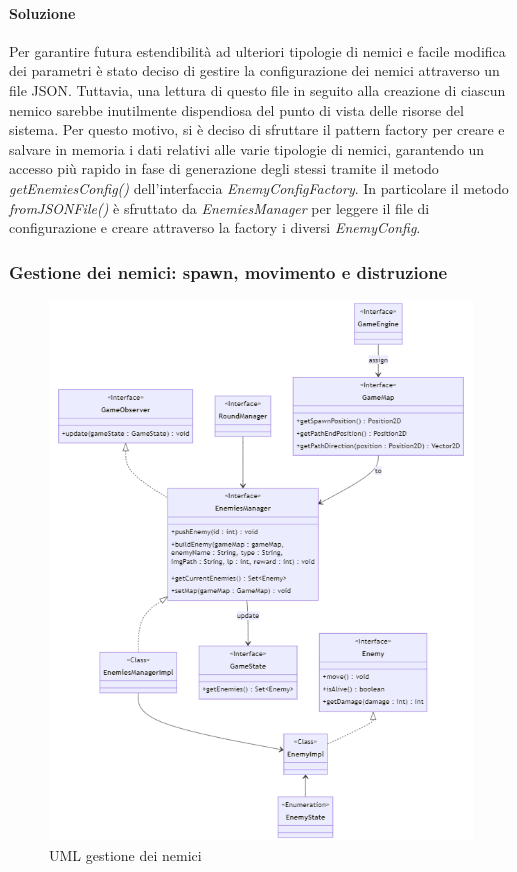 \documentclass[a4paper,12pt]{report}
\begin{document}
\paragraph{Soluzione} Per garantire futura estendibilità ad ulteriori tipologie di nemici e facile modifica dei parametri è stato deciso di gestire la configurazione dei nemici attraverso un file JSON. Tuttavia, una lettura di questo file in seguito alla creazione di ciascun nemico sarebbe inutilmente dispendiosa del punto di vista delle risorse del sistema. Per questo motivo, si è deciso di sfruttare il pattern factory per creare e salvare in memoria i dati relativi alle varie tipologie di nemici, garantendo un accesso più rapido in fase di generazione degli stessi tramite il metodo \textit{getEnemiesConfig()} dell'interfaccia \textit{EnemyConfigFactory}. In particolare il metodo \textit{fromJSONFile()} è sfruttato da \textit{EnemiesManager} per leggere il file di configurazione e creare attraverso la factory i diversi \textit{EnemyConfig}.

\subsubsection{Gestione dei nemici: spawn, movimento e distruzione}

\begin{figure}[H]
    \centering
    \includegraphics[scale=0.8]{RelazioneTD/images/enemiesManagerUML.png}
    \caption{UML gestione dei nemici}
    \label{fig:enter-label}
\end{figure}
\end{document}

